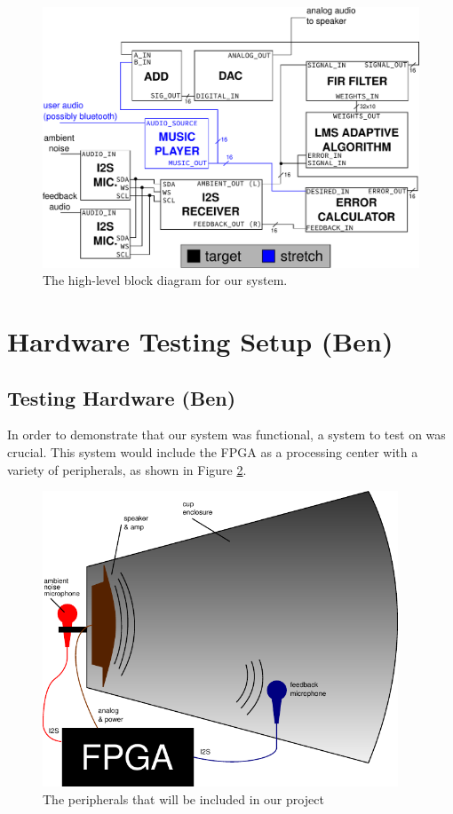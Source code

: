 \documentclass{fpgairpods}
\begin{document}
\begin{figure}
\includegraphics[width=\textwidth]{./figs/block_diagram.pdf}
\caption{The high-level block diagram for our system.}
\label{fig:blockdiagram}
\end{figure}


\newpage
\section{Hardware Testing Setup (Ben)}
\subsection{Testing Hardware (Ben)}
In order to demonstrate that our system was functional, a system to test on was crucial. This system would include the FPGA as a processing center with a variety of peripherals, as shown in Figure \ref{fig:peripherals}.

\begin{figure}[h]
\centering
\includegraphics[width=300pt]{./figs/system_diagram_with_text.pdf}
\caption{The peripherals that will be included in our project}
\label{fig:peripherals}
\end{figure}
\end{document}
